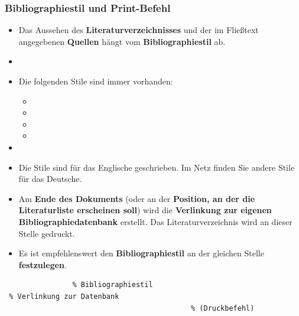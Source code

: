 \begin{frame}[fragile]
\frametitle{Bibliographiestil und Print-Befehl}

\begin{itemize}
	\item Das Aussehen des \textbf{Literaturverzeichnisses} und der im Fließtext angegebenen \textbf{Quellen} hängt vom \textbf{Bibliographiestil} ab.
	
	\item[]
	
	\item Die folgenden Stile sind immer vorhanden:
	
	\begin{itemize}
		\item {}
		\item {}
		\item {}
		\item {}
	\end{itemize}

	\item[]
	
	\item Die Stile sind \idR für das Englische geschrieben. Im Netz finden Sie andere Stile für das Deutsche.
\end{itemize}

\end{frame}


\begin{frame}[fragile]

\begin{itemize}	
	\item Am \textbf{Ende des Dokuments} (oder an der \textbf{Position, an der die Literaturliste erscheinen soll}) wird die \textbf{Verlinkung zur eigenen Bibliographiedatenbank} erstellt. Das Literaturverzeichnis wird an dieser Stelle gedruckt.
		
	\item Es ist empfehlenswert den \textbf{Bibliographiestil} an der gleichen Stelle \textbf{festzulegen}.

\end{itemize}

\begin{lstlisting}
                % Bibliographiestil
 % Verlinkung zur Datenbank
                                            % (Druckbefehl)
\end{lstlisting}
\end{frame}


